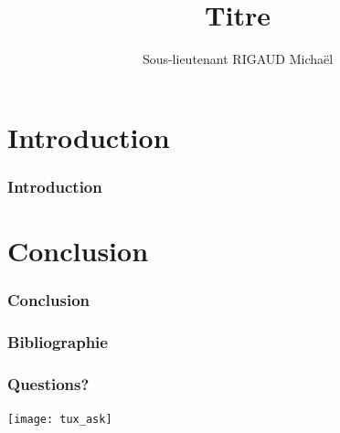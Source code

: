 \documentclass[10pt, svgnames, compress, red]{beamer}
\institute{ENSTA Bretagne}
\title{Titre}
\subtitle{}
\author{Sous-lieutenant RIGAUD Michaël}
\begin{document}
\begin{frame}
  \titlepage
  \transdissolve[duration=0.1] 
\end{frame}


\section{Introduction}
\begin{frame}
  \frametitle{Introduction}
  \transdissolve[duration=0.1] 
\end{frame}



\section{Conclusion}
\begin{frame}	
  \frametitle{Conclusion}

  \transdissolve[duration=0.1] 
\end{frame}


\begin{frame}[allowframebreaks]
  \frametitle{Bibliographie}
  \nocite{*}
  
  \transdissolve[duration=0.1] 
\end{frame}


\begin{frame}
  \frametitle{Questions?}		
  
  \begin{center}
    \texttt{[image: tux\_ask]}
  \end{center}
  \transdissolve[duration=0.1] 
\end{frame}	
\end{document}
